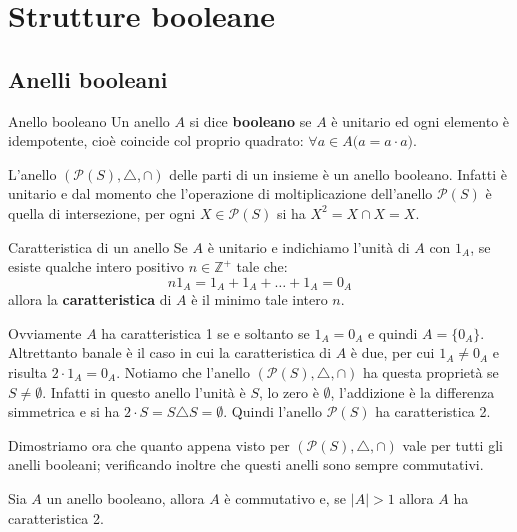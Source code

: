 \pagebreak
\section{Strutture booleane}
\subsection{Anelli booleani}
\begin{defbox}{Anello booleano}
	Un anello $A$ si dice \textbf{booleano} se $A$ è unitario ed ogni elemento è idempotente, cioè coincide col proprio quadrato: $\forall a \in A \bigl(a = a \cdot a\bigr)$.
\end{defbox}

\begin{example}
	L'anello $(\mathcal{P}(S),\triangle,\cap)$ delle parti di un insieme è un anello booleano. Infatti è unitario e dal momento che l'operazione di moltiplicazione dell'anello $\mathcal{P}(S)$ è quella di intersezione, per ogni $X \in \mathcal{P}(S)$ si ha $X^{2}= X \cap X = X$.
\end{example}

\begin{defbox}{Caratteristica di un anello}
	Se $A$ è unitario e indichiamo l'unità di $A$ con $1_{A}$, se esiste qualche intero positivo $n \in \mathbb{Z^{+}}$ tale che:
	\begin{displaymath}
		n 1_{A} = 1_{A}+ 1_{A}+ \dots + 1_{A} = 0_{A}
	\end{displaymath}
	allora la \textbf{caratteristica} di $A$ è il minimo tale intero $n$.
\end{defbox}


\begin{osservation}
	Ovviamente $A$ ha caratteristica 1 se e soltanto se $1_{A}=0_{A}$ e quindi $A=\{0_{A}\}$. Altrettanto banale è il caso in cui la caratteristica di $A$ è due, per cui $1_{A} \neq 0_{A}$ e risulta $2 \cdot 1_{A}=0_{A}$. Notiamo che l'anello $(\mathcal{P}(S),\triangle, \cap)$ ha questa proprietà se $S \neq \emptyset$. Infatti in questo anello l'unità è $S$, lo zero è $\emptyset$, l'addizione è la differenza simmetrica e si ha $ 2 \cdot S = S \triangle S = \emptyset$. Quindi l'anello $\mathcal{P}(S)$ ha caratteristica 2.
\end{osservation}
Dimostriamo  ora che quanto appena visto per $(\mathcal{P}(S),\triangle, \cap)$ vale per tutti gli anelli booleani; verificando inoltre che questi anelli sono sempre commutativi.

\begin{propbox}
	Sia $A$ un anello booleano, allora $A$ è commutativo e, se $|A|>1$ allora $A$ ha caratteristica 2.
\end{propbox}

